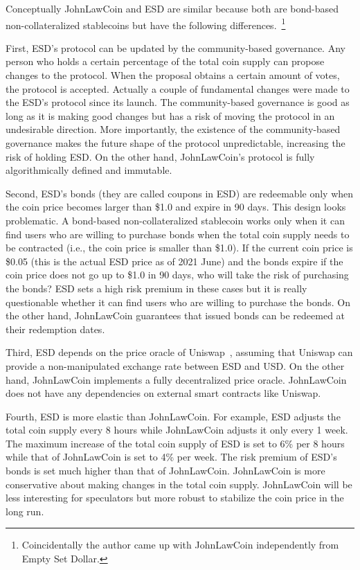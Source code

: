 \documentclass[dvipdfmx,a4paper]{article}
\begin{document}
Conceptually JohnLawCoin and ESD are similar because both are bond-based non-collateralized stablecoins but have the following differences.~\footnote{Coincidentally the author came up with JohnLawCoin independently from Empty Set Dollar.}

First, ESD's protocol can be updated by the community-based governance. Any person who holds a certain percentage of the total coin supply can propose changes to the protocol. When the proposal obtains a certain amount of votes, the protocol is accepted. Actually a couple of fundamental changes were made to the ESD's protocol since its launch. The community-based governance is good as long as it is making good changes but has a risk of moving the protocol in an undesirable direction. More importantly, the existence of the community-based governance  makes the future shape of the protocol unpredictable, increasing the risk of holding ESD. On the other hand, JohnLawCoin's protocol is fully algorithmically defined and immutable.

Second, ESD's bonds (they are called coupons in ESD) are redeemable only when the coin price becomes larger than \$1.0 and expire in 90 days. This design looks problematic. A bond-based non-collateralized stablecoin works only when it can find users who are willing to purchase bonds when the total coin supply needs to be contracted (i.e., the coin price is smaller than \$1.0). If the current coin price is \$0.05 (this is the actual ESD price as of 2021 June) and the bonds expire if the coin price does not go up to \$1.0 in 90 days, who will take the risk of purchasing the bonds? ESD sets a high risk premium in these cases but it is really questionable whether it can find users who are willing to purchase the bonds. On the other hand, JohnLawCoin guarantees that issued bonds can be redeemed at their redemption dates.

Third, ESD depends on the price oracle of Uniswap~\cite{uniswap}, assuming that Uniswap can provide a non-manipulated exchange rate between ESD and USD. On the other hand, JohnLawCoin implements a fully decentralized price oracle. JohnLawCoin does not have any dependencies on external smart contracts like Uniswap.

Fourth, ESD is more elastic than JohnLawCoin. For example, ESD adjusts the total coin supply every 8 hours while JohnLawCoin adjusts it only every 1 week. The maximum increase of the total coin supply of ESD is set to 6\% per 8 hours while that of JohnLawCoin is set to 4\% per week. The risk premium of ESD's bonds is set much higher than that of JohnLawCoin. JohnLawCoin is more conservative about making changes in the total coin supply. JohnLawCoin will be less interesting for speculators but more robust to stabilize the coin price in the long run.
\end{document}
